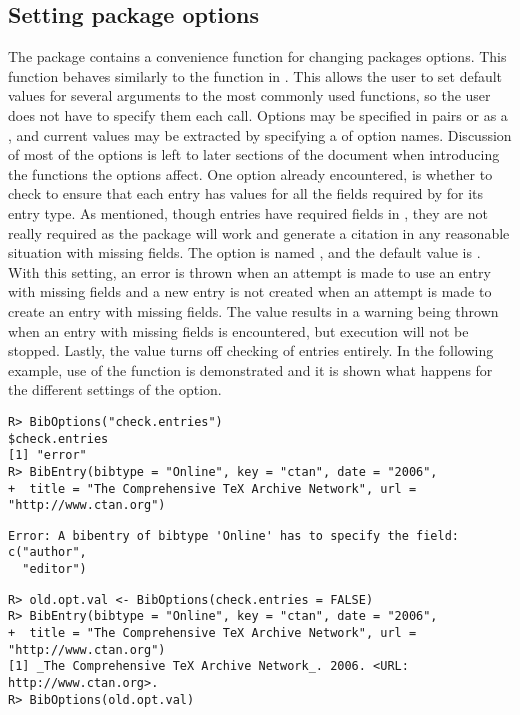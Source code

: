 \documentclass[article]{jss}\usepackage[]{graphicx}\usepackage[]{color}
\makeatletter
\newenvironment{kframe}{%
 \def\at@end@of@kframe{}%
 \ifinner\ifhmode%
  \def\at@end@of@kframe{\end{minipage}}%
  \begin{minipage}{\columnwidth}%
 \fi\fi%
 \def\FrameCommand##1{\hskip\@totalleftmargin \hskip-\fboxsep
 \colorbox{shadecolor}{##1}\hskip-\fboxsep
     \hskip-\linewidth \hskip-\@totalleftmargin \hskip\columnwidth}%
 \MakeFramed {\advance\hsize-\width
   \@totalleftmargin\z@ \linewidth\hsize
   \@setminipage}}%
 {\par\unskip\endMakeFramed%
 \at@end@of@kframe}
\newenvironment{knitrout}{}{} %
\makeatother
\begin{document}
\subsection{Setting package options}
The package contains a convenience function  for changing packages options.  This function behaves similarly to the  function in .  This allows the user to set default values for several arguments to the most commonly used functions, so the user does not have to specify them each call.  Options may be specified in  pairs or as a , and current values may be extracted by specifying a  of option names.  Discussion of most of the options is left to later sections of the document when introducing the functions the options affect.  One option already encountered, is whether to check to ensure that each entry has values for all the fields required by \Biblatex{} for its entry type.  As mentioned, though entries have required fields in \Biblatex{}, they are not really required as the package will work and generate a citation in any reasonable situation with missing fields.  The option is named , and the default value is .  With this setting, an error is thrown when an attempt is made to use an entry with missing fields and a new entry is not created when an attempt is made to create an entry with missing fields.  The value  results in a warning being thrown when an entry with missing fields is encountered, but execution will not be stopped.  Lastly, the value  turns off checking of entries entirely.  In the following example, use of the  function is demonstrated and it is shown what happens for the different settings of the  option.
\begin{knitrout}
\color{fgcolor}\begin{kframe}
\begin{verbatim}
R> BibOptions("check.entries")
$check.entries
[1] "error"
R> BibEntry(bibtype = "Online", key = "ctan", date = "2006", 
+  title = "The Comprehensive TeX Archive Network", url = "http://www.ctan.org")
\end{verbatim}
\begin{lstlisting}[style=output]
Error: A bibentry of bibtype 'Online' has to specify the field: c("author", 
  "editor")
\end{lstlisting}\begin{verbatim}
R> old.opt.val <- BibOptions(check.entries = FALSE)
R> BibEntry(bibtype = "Online", key = "ctan", date = "2006", 
+  title = "The Comprehensive TeX Archive Network", url = "http://www.ctan.org")
[1] _The Comprehensive TeX Archive Network_. 2006. <URL:
http://www.ctan.org>.
R> BibOptions(old.opt.val)  
\end{verbatim}
\end{kframe}
\end{knitrout}
\end{document}
